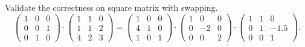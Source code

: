 \documentclass[
  course = {{16-811 Math Fundamentals for Robotics}},
  quartile = {{1}},
  assignment = 1,
  name = {{Kangle Deng}},
  email = {{kangled@andrew.cmu.edu}},
  firstexercise = 1
]{aga-homework}
\begin{document}
\subexercise
Validate the correctness on square matrix with swapping.
\begin{equation*}
    \left(
    \begin{array}{ccc}
        1 & 0 & 0 \\
        0 & 0 & 1 \\
        0 & 1 & 0
    \end{array}
    \right) \cdot
    \left(
    \begin{array}{ccc}
        1 & 1 & 0 \\
        1 & 1 & 2 \\
        4 & 2 & 3
    \end{array}
    \right) =
    \left(
    \begin{array}{ccc}
        1 & 0 & 0 \\
        4 & 1 & 0 \\
        1 & 0 & 1
    \end{array}
    \right) \cdot
    \left(
    \begin{array}{ccc}
        1 & 0 & 0 \\
        0 & -2 & 0 \\
        0 & 0 & 2
    \end{array}
    \right) \cdot
    \left(
    \begin{array}{ccc}
        1 & 1 & 0 \\
        0 & 1 & -1.5 \\
        0 & 0 & 1
    \end{array}
    \right).
\end{equation*}
\end{document}
